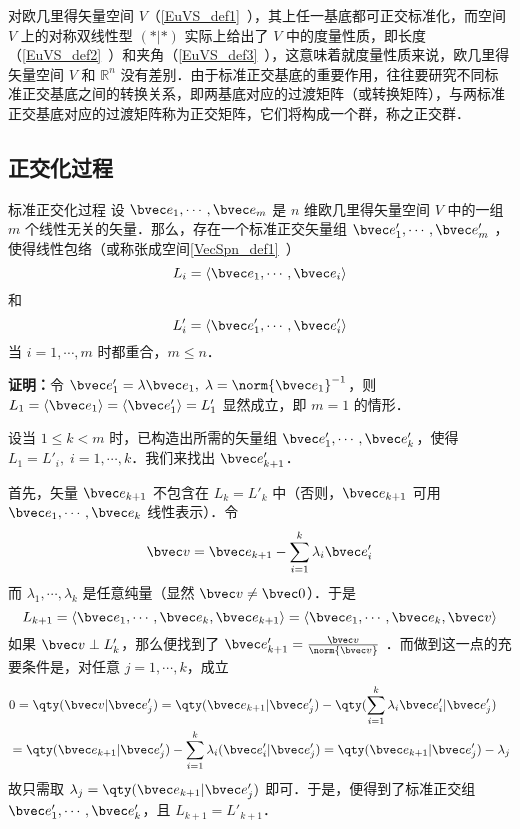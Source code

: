 
对欧几里得矢量空间 $V$（\autoref{EuVS_def1}~），其上任一基底都可正交标准化，而空间 $V$ 上的对称双线性型 $(*|*)$ 实际上给出了 $V$ 中的度量性质，即长度（\autoref{EuVS_def2}~）和夹角（\autoref{EuVS_def3}~），这意味着就度量性质来说，欧几里得矢量空间 $V$ 和 $\mathbb{R}^n$ 没有差别．由于标准正交基底的重要作用，往往要研究不同标准正交基底之间的转换关系，即两基底对应的过渡矩阵（或转换矩阵），与两标准正交基底对应的过渡矩阵称为正交矩阵，它们将构成一个群，称之正交群．
\subsection{正交化过程}
\begin{theorem}{标准正交化过程}\label{EVOIOG_the1}
设 $\bvec e_1,\cdots,\bvec e_m$ 是 $n$ 维欧几里得矢量空间 $V$ 中的一组 $m$ 个线性无关的矢量．那么，存在一个标准正交矢量组 $\bvec e'_1,\cdots,\bvec e'_m$ ，使得线性包络（或称张成空间\autoref{VecSpn_def1}~）
\begin{equation}
L_i=\langle\bvec e_1,\cdots,\bvec e_i\rangle
\end{equation}
和
\begin{equation}
L'_i=\langle\bvec e'_1,\cdots,\bvec e'_i\rangle
\end{equation}
当 $i=1,\cdots,m$ 时都重合，$m\leq n$．
\end{theorem}
\textbf{证明：}令 $\bvec e'_1=\lambda\bvec e_1,\;\lambda=\norm{\bvec e_1}^{-1}$，则 $L_1=\langle\bvec e_1\rangle=\langle \bvec e'_1\rangle=L'_1$ 显然成立，即 $m=1$ 的情形．

设当 $1\leq k<m$ 时，已构造出所需的矢量组 $\bvec e'_1,\cdots,\bvec e'_k$，使得 $L_1=L'_i,\;i=1,\cdots,k$．我们来找出 $\bvec e'_{k+1}$．

首先，矢量 $\bvec e_{k+1}$ 不包含在 $L_k=L'_k$ 中（否则，$\bvec e_{k+1}$ 可用 $\bvec e_1,\cdots,\bvec e_k$ 线性表示）．令
\begin{equation}
\bvec v=\bvec e_{k+1}-\sum_{i=1}^{k}\lambda_i\bvec e'_i
\end{equation}
而 $\lambda_1,\cdots,\lambda_k$ 是任意纯量（显然 $\bvec v\neq\bvec 0$）．于是
\begin{equation}
L_{k+1}=\langle\bvec e_1,\cdots,\bvec e_k,\bvec e_{k+1}\rangle=\langle\bvec e_1,\cdots,\bvec e_k,\bvec v\rangle
\end{equation}
如果 $\bvec v\perp L'_k$，那么便找到了 $\bvec e'_{k+1}=\frac{\bvec v}{\norm{\bvec v}}$ ．而做到这一点的充要条件是，对任意 $j=1,\cdots,k$，成立
\begin{equation}
\begin{aligned}
&0=\qty(\bvec v|\bvec e'_j)=\qty(\bvec e_{k+1}|\bvec e'_j)-\qty(\sum_{i=1}^k\lambda_i\bvec e'_i|\bvec e'_j)\\
&=\qty(\bvec e_{k+1}|\bvec e'_j)-\sum_{i=1}^k\lambda_i(\bvec e'_i|\bvec e'_j)=\qty(\bvec e_{k+1}|\bvec e'_j)-\lambda_j
\end{aligned}
\end{equation}
故只需取 $\lambda_j=\qty(\bvec e_{k+1}|\bvec e'_j)$ 即可．于是，便得到了标准正交组 $\bvec e'_1,\cdots,\bvec e'_k$，且 $L_{k+1}=L'_{k+1}$．

